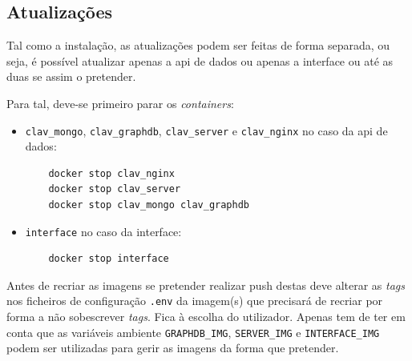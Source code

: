 \subsection{Atualizações}

Tal como a instalação, as atualizações podem ser feitas de forma separada, ou seja, é possível atualizar apenas a \acrshort{api} de dados ou apenas a interface ou até as duas se assim o pretender.

Para tal, deve-se primeiro parar os \textit{containers}:
\begin{itemize}
    \item \texttt{clav\_mongo}, \texttt{clav\_graphdb}, \texttt{clav\_server} e \texttt{clav\_nginx} no caso da \acrshort{api} de dados:
    \begin{verbatim}
    docker stop clav_nginx
    docker stop clav_server
    docker stop clav_mongo clav_graphdb
    \end{verbatim}
    \item \texttt{interface} no caso da interface:
    \begin{verbatim}
    docker stop interface
    \end{verbatim}       
\end{itemize}

Antes de recriar as imagens se pretender realizar push destas deve alterar as \textit{tags} nos ficheiros de configuração \texttt{.env} da imagem(s) que precisará de recriar por forma a não sobescrever \textit{tags}. Fica à escolha do utilizador. Apenas tem de ter em conta que as variáveis ambiente \texttt{GRAPHDB\_IMG}, \texttt{SERVER\_IMG} e \texttt{INTERFACE\_IMG} podem ser utilizadas para gerir as imagens da forma que pretender.

